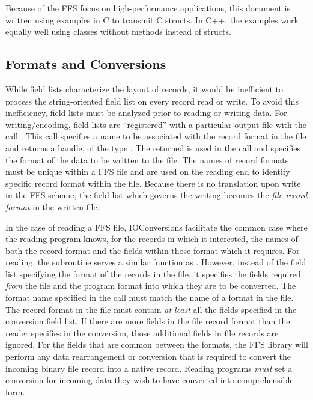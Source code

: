 Because of the FFS focus on high-performance applications, this document
is written using examples in C to transmit C structs.  In C++, the examples
work equally well using classes without methods instead of structs.

\subsection{Formats and Conversions}

While field lists characterize the layout of records, it would be inefficient
to process the string-oriented field list on every record read or write.  To
avoid this inefficiency, field lists must be analyzed prior to reading or
writing data.  For writing/encoding, field lists are ``registered'' with a
particular output file with the call .  This
call specifies a name to be associated with the record format in the file and
returns a handle, of the type .  The returned  is used in
the 
 call and specifies the format of the data to be written to the
file.  The names of record formats must be unique within a FFS file and are
used on the reading end to identify specific record format within the file.
Because there is no translation upon write in the FFS scheme, the field list
which governs the writing  becomes the {\it file record format} in
the written file.

In the case of reading a FFS file, IOConversions facilitate the common case
where the reading program knows, for the records in which it interested, the
names of both the record format and the fields within those format which it
requires.  For reading, the subroutine  serves a
similar function as .  However, instead of
the field list specifying the format of the records in the file, it specifies
the fields required {\it from} the file and the program format into which they
are to be converted.  The format name specified in the
 call must match the name of a format in the file.
The record format in the file must contain {\it at least} all the fields
specified in the conversion field list.  If there are more fields in the file
record format than the reader specifies in the conversion, those additional
fields in file records are ignored.  For the fields that are common between
the formats, the FFS library will perform any data rearrangement or conversion
that is required to convert the incoming binary file record into a native
record.  Reading programs {\it must} set a conversion for incoming data they
wish to have converted into comprehensible form.  

